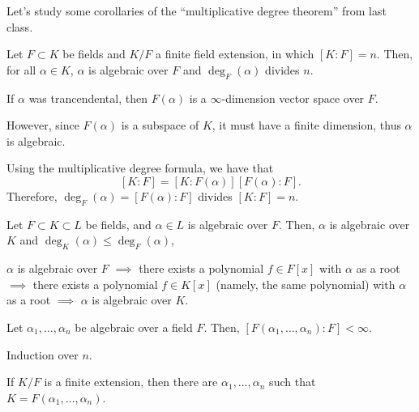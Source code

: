 
Let's study some corollaries of the ``multiplicative degree theorem'' from last class.

\begin{cor}
	Let $F \subset K$ be fields and $K / F$ a finite field extension, in which $[K : F] = n$.
	Then, for all $\alpha \in K$, $\alpha$ is algebraic over $F$ and $\deg_F(\alpha)$ divides $n$.
\end{cor}

\begin{dem}[Algebraic]
	If $\alpha$ was trancendental, then $F(\alpha)$ is a $\infty$-dimension vector space over $F$.
	
	However, since $F(\alpha)$ is a subspace of $K$, it must have a finite dimension, thus $\alpha$ is algebraic.
\end{dem}

\begin{dem}[Division]
	Using the multiplicative degree formula, we have that \[[K:F] = [K:F(\alpha)] [F(\alpha):F].\] Therefore, $\deg_F(\alpha) = [F(\alpha) : F]$ divides  $[K:F] = n$.
\end{dem}

\begin{cor}
	Let $F \subset K \subset L$ be fields, and $\alpha \in L$ is algebraic over $F$. Then, $\alpha$ is algebraic over $K$ and $\deg_K(\alpha) \leq \deg_F(\alpha)$,
\end{cor}

\begin{dem}[Algebraic]
	$\alpha$ is algebraic over $F$  $\implies$ there exists a polynomial $f \in F[x]$ with  $\alpha$ as a root $\implies$ there exists a polynomial $f \in K[x]$ (namely, the same polynomial) with $\alpha$ as a root $\implies$ $\alpha$ is algebraic over $K$.
\end{dem}

\begin{cor}
	Let $\alpha_1, \dots, \alpha_n$ be algebraic over a  field $F$. Then, $[F(\alpha_1, \dots, \alpha_n) : F] < \infty$.
\end{cor}

\begin{sk}
	Induction over $n$.
\end{sk}

\begin{cor}
	If $K/F$ is a finite extension, then there are $\alpha_1, \dots, \alpha_n$ such that $K = F(\alpha_1, \dots, \alpha_n)$.
\end{cor}


